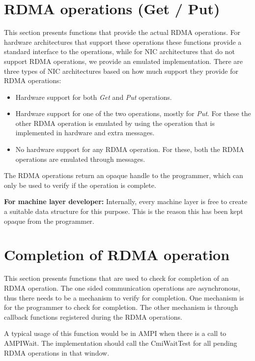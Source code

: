 \section{RDMA operations (Get / Put)}
This section presents functions that provide the actual RDMA operations.
For hardware architectures that support these operations these functions 
provide a standard interface to the operations, while for NIC architectures that
do not support RDMA operations, we provide an emulated implementation.
There are three types of NIC architectures based on how much support they
provide for RDMA operations:
\begin{itemize}
\item Hardware support for both {\it Get} and {\it Put} operations.
\item Hardware support for one of the two operations, mostly for {\it Put}. For these
the other RDMA operation is emulated by using the operation that is implemented
in hardware and extra messages.
\item No hardware support for any RDMA operation. For these, both the RDMA operations
are emulated through messages.
\end{itemize}

The RDMA operations return an opaque handle to the programmer, which can 
only be used to verify if the operation is complete.

{\bf For machine layer developer:} Internally, every machine layer is free
to create a suitable data structure for this purpose. This is the reason this
has been kept opaque from the programmer.




\section{Completion of RDMA operation}
This section presents functions that are used to check for completion
of an RDMA operation. The one sided communication operations are
asynchronous, thus there needs to be a mechanism to verify for completion.
One mechanism is for the programmer to check for completion. The other 
mechanism is through callback functions registered during the RDMA operations.


A typical usage of this function would be in AMPI when there is a call to
AMPIWait. The implementation should call the CmiWaitTest for all 
pending RDMA operations in that window.
